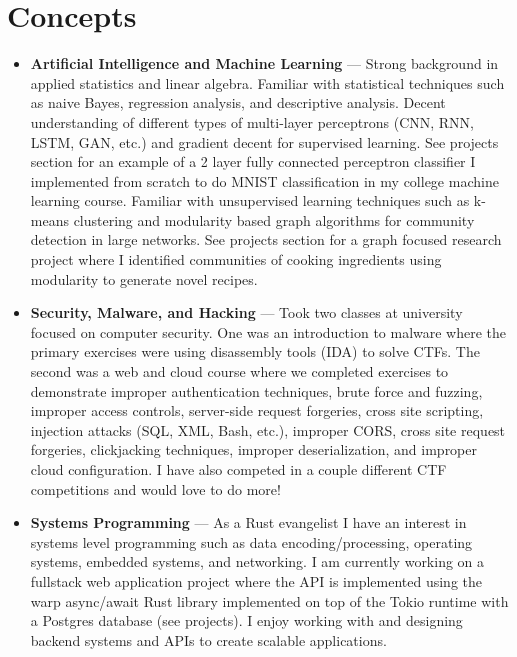 \documentclass{article}
\begin{document}
\section{Concepts}
\begin{itemize}
   \item \textbf{Artificial Intelligence and Machine Learning} --- Strong background in applied statistics and linear algebra. Familiar with
         statistical techniques such as naive Bayes, regression analysis, and descriptive analysis. Decent understanding of different
         types of multi-layer perceptrons (CNN, RNN, LSTM, GAN, etc.) and gradient decent for supervised learning.
         See projects section for an example of a 2 layer
         fully connected perceptron classifier I implemented from scratch to do MNIST classification in my college machine learning course.
         Familiar with unsupervised learning techniques such as k-means clustering and modularity based graph algorithms for community
         detection in large networks. See projects section for a graph focused research project where I identified communities of cooking
         ingredients using modularity to generate novel recipes.
      \item \textbf{Security, Malware, and Hacking} --- Took two classes at university focused on computer security. One was an introduction to malware
         where the primary exercises were using disassembly tools (IDA) to solve CTFs. The second was a web and cloud course where we
         completed exercises to demonstrate improper authentication techniques, brute force and fuzzing, improper access controls,
         server-side request forgeries, cross site scripting, injection attacks (SQL, XML, Bash, etc.), improper CORS, cross site request
         forgeries, clickjacking techniques, improper deserialization, and improper cloud configuration. I have also competed in a couple
         different CTF competitions and would love to do more!
      \item \textbf{Systems Programming} --- As a Rust evangelist I have an interest in systems level programming such as data encoding/processing,
         operating systems, embedded systems, and networking. I am currently working on a fullstack web application project where the API
         is implemented using the warp async/await Rust library implemented on top of the Tokio runtime with a Postgres database (see projects).
         I enjoy working with and designing backend systems and APIs to create scalable applications.
\end{itemize}
\end{document}
